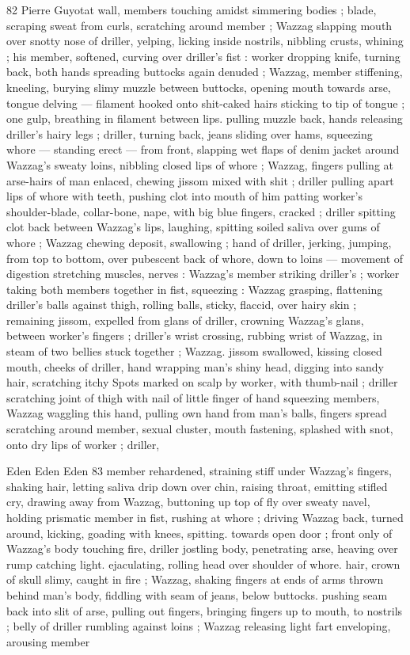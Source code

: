 82 Pierre Guyotat
wall, members touching amidst simmering bodies ; blade, scraping
sweat from curls, scratching around member ; Wazzag slapping
mouth over snotty nose of driller, yelping, licking inside nostrils,
nibbling crusts, whining ; his member, softened, curving over driller's
fist : worker dropping knife, turning back, both hands spreading
buttocks again denuded ; Wazzag, member stiffening, kneeling,
burying slimy muzzle between buttocks, opening mouth towards
arse, tongue delving — filament hooked onto shit-caked hairs
sticking to tip of tongue ; one gulp, breathing in filament between
lips. pulling muzzle back, hands releasing driller's hairy legs ; driller,
turning back, jeans sliding over hams, squeezing whore — standing
erect — from front, slapping wet flaps of denim jacket around
Wazzag's sweaty loins, nibbling closed lips of whore ; Wazzag,
fingers pulling at arse-hairs of man enlaced, chewing jissom mixed
with shit ; driller pulling apart lips of whore with teeth, pushing clot
into mouth of him patting worker's shoulder-blade, collar-bone,
nape, with big blue fingers, cracked ; driller spitting clot back
between Wazzag's lips, laughing, spitting soiled saliva over gums of
whore ; Wazzag chewing deposit, swallowing ; hand of driller, jerking,
jumping, from top to bottom, over pubescent back of whore, down to
loins — movement of digestion stretching muscles, nerves :
Wazzag's member striking driller's ; worker taking both members
together in fist, squeezing : Wazzag grasping, flattening driller's
balls against thigh, rolling balls, sticky, flaccid, over hairy skin ;
remaining jissom, expelled from glans of driller, crowning Wazzag's
glans, between worker's fingers ; driller's wrist crossing, rubbing
wrist of Wazzag, in steam of two bellies stuck together ; Wazzag.
jissom swallowed, kissing closed mouth, cheeks of driller, hand
wrapping man's shiny head, digging into sandy hair, scratching itchy
Spots marked on scalp by worker, with thumb-nail ; driller scratching
joint of thigh with nail of little finger of hand squeezing members,
Wazzag waggling this hand, pulling own hand from man’s balls,
fingers spread scratching around member, sexual cluster, mouth
fastening, splashed with snot, onto dry lips of worker ; driller,

Eden Eden Eden 83
member rehardened, straining stiff under Wazzag's fingers, shaking
hair, letting saliva drip down over chin, raising throat, emitting stifled
cry, drawing away from Wazzag, buttoning up top of fly over sweaty
navel, holding prismatic member in fist, rushing at whore ; driving
Wazzag back, turned around, kicking, goading with knees, spitting.
towards open door ; front only of Wazzag's body touching fire, driller
jostling body, penetrating arse, heaving over rump catching light.
ejaculating, rolling head over shoulder of whore. hair, crown of skull
slimy, caught in fire ; Wazzag, shaking fingers at ends of arms thrown
behind man’s body, fiddling with seam of jeans, below buttocks.
pushing seam back into slit of arse, pulling out fingers, bringing
fingers up to mouth, to nostrils ; belly of driller rumbling against
loins ; Wazzag releasing light fart enveloping, arousing member

